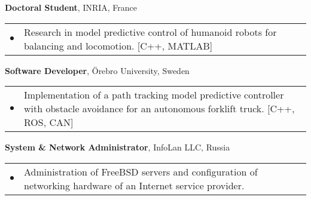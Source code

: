 \documentclass[a4paper,10pt]{report}
\begin{document}
\begin{adjustwidth}{0.5cm}{0pt}
    \vspace{0.15cm}

    {\bf {} Doctoral Student}, INRIA, France\\
        \begin{tabularx}{\linewidth}{l X}
            \hfill $\bullet$    & Research in model predictive control of humanoid robots for
                                  balancing and locomotion.
                                  [C++, MATLAB]
        \end{tabularx}

    \vspace{0.15cm}

    {\bf {} Software Developer}, \"Orebro University, Sweden\\
        \begin{tabularx}{\linewidth}{l X}
            \hfill $\bullet$    &   Implementation of a path tracking model predictive controller
                                    with obstacle avoidance for an autonomous forklift truck.
                                    [C++, ROS, CAN]
        \end{tabularx}

    \vspace{0.15cm}

    {\bf {} System \& Network Administrator}, InfoLan LLC, Russia\\
        \begin{tabularx}{\linewidth}{l X}
            \hfill $\bullet$    &   Administration of FreeBSD servers and configuration of
                                    networking hardware of an Internet service provider.\\
        \end{tabularx}
\end{adjustwidth}


\vspace{0.15cm}
\end{document}
